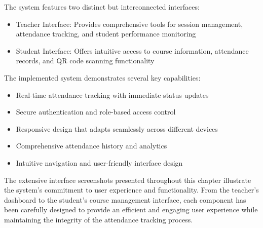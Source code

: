 The system features two distinct but interconnected interfaces:
\begin{itemize}
    \item Teacher Interface: Provides comprehensive tools for session management, attendance tracking, and student performance monitoring
    \item Student Interface: Offers intuitive access to course information, attendance records, and QR code scanning functionality
\end{itemize}

The implemented system demonstrates several key capabilities:
\begin{itemize}
    \item Real-time attendance tracking with immediate status updates
    \item Secure authentication and role-based access control
    \item Responsive design that adapts seamlessly across different devices
    \item Comprehensive attendance history and analytics
    \item Intuitive navigation and user-friendly interface design
\end{itemize}

The extensive interface screenshots presented throughout this chapter illustrate the system's commitment to user experience and functionality. From the teacher's dashboard to the student's course management interface, each component has been carefully designed to provide an efficient and engaging user experience while maintaining the integrity of the attendance tracking process.
